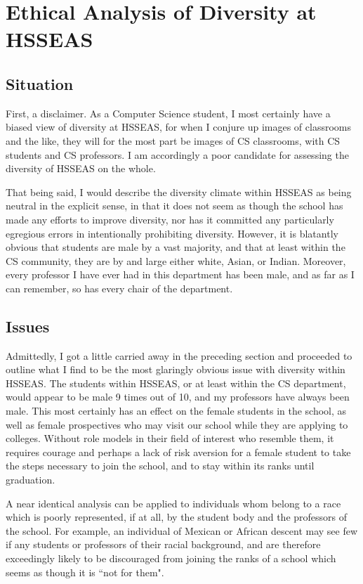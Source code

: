 \documentclass[]{article}
\begin{document}
\section{Ethical Analysis of Diversity at HSSEAS}
\subsection{Situation}
First, a disclaimer. As a Computer Science student, I most certainly have a biased view of diversity at HSSEAS, for when I conjure up images of classrooms and the like, they will for the most part be images of CS classrooms, with CS students and CS professors. I am accordingly a poor candidate for assessing the diversity of HSSEAS on the whole.

That being said, I would describe the diversity climate within HSSEAS as being neutral in the explicit sense, in that it does not seem as though the school has made any efforts to improve diversity, nor has it committed any particularly egregious errors in intentionally prohibiting diversity. However, it is blatantly obvious that students are male by a vast majority, and that at least within the CS community, they are by and large either white, Asian, or Indian. Moreover, every professor I have ever had in this department has been male, and as far as I can remember, so has every chair of the department.

\subsection{Issues}
Admittedly, I got a little carried away in the preceding section and proceeded to outline what I find to be the most glaringly obvious issue with diversity within HSSEAS. The students within HSSEAS, or at least within the CS department, would appear to be male 9 times out of 10, and my professors have always been male. This most certainly has an effect on the female students in the school, as well as female prospectives who may visit our school while they are applying to colleges. Without role models in their field of interest who resemble them, it requires courage and perhaps a lack of risk aversion for a female student to take the steps necessary to join the school, and to stay within its ranks until graduation.

A near identical analysis can be applied to individuals whom belong to a race which is poorly represented, if at all, by the student body and the professors of the school. For example, an individual of Mexican or African descent may see few if any students or professors of their racial background, and are therefore exceedingly likely to be discouraged from joining the ranks of a school which seems as though it is ``not for them".
\end{document}
